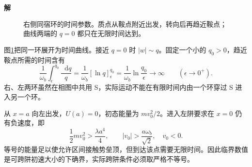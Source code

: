 \documentclass[11pt,openany,fontset=fandol]{ctexbook}
\theoremstyle{definition}\newtheorem{example}{例}[chapter]\newtheorem{exercise}{习题}[chapter]
\newcommand{\SolutionStart}{\par\medskip\ifdim\pagetotal>0pt\ifdim\dimexpr\pagegoal-\pagetotal\relax<3\baselineskip\newpage\fi\fi\noindent\textbf{解}\quad\ignorespaces}
\newenvironment{solution}{\SolutionStart}{\par\medskip}
\newcommand{\dd}{\mathop{}\!\mathrm d}\newcommand{\ee}{\mathrm e}\newcommand{\vct}[1]{\bm{#1}}
\begin{document}
\begin{solution}
\begin{figure}[H]\centering
{}
\caption{右侧同宿环的时间参数。质点从鞍点附近出发，转向后再趋近鞍点；曲线两端的 $q=0$ 都只在无限时间达到。}\label{mp4:fig:l4-e5-time}
\end{figure}

图\ref{mp4:fig:l4-e5-time}把同一环展开为时间曲线。接近 $q=0$ 时 $|w|\sim q$。固定一个小的 $q_0>0$，趋近鞍点所需的时间含有
\[
\frac1{\omega_b}\int_\epsilon^{q_0}\frac{\dd q}{q}
=\frac1{\omega_b}[\ln q]_\epsilon^{q_0}
=\frac1{\omega_b}\ln\frac{q_0}\epsilon
\longrightarrow\infty\qquad(\epsilon\to0^+).
\]
右、左两环虽然在相图中共用 S，实际运动不能在有限时间内由一个环穿过 S 进入另一个环。

从 $x=a$ 向左出发，$U(a)=0$，初态能量为 $mv_0^2/2$。进入左阱要求在 $x=0$ 仍有负速度，即
\[
\frac12mv_0^2>\frac{\lambda a^4}{4},
\qquad |v_0|>\frac{a\omega_b}{\sqrt2},\quad v_0<0.
\]
等号的能量足以使允许区间接触势垒顶，但到达该点需要无限时间。因此临界数值是可跨阱初速大小的下确界，实际跨阱条件必须取严格不等号。
\end{solution}
\end{document}
